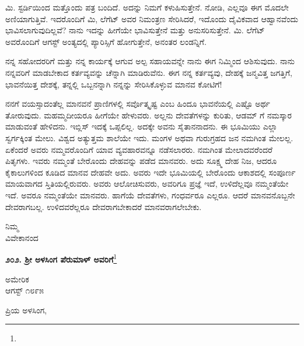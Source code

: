 \vspace{0.15cm}

ಮಿ. ಸ್ಟರ್ಡಿಯಿಂದ ಮತ್ತೊಂದು ಪತ್ರ ಬಂದಿದೆ. ಅದನ್ನು ನಿಮಗೆ ಕಳುಹಿಸುತ್ತೇನೆ. ನೋಡಿ, ಎಲ್ಲವೂ ಈಗ ಮೊದಲೇ ಅಣಿಯಾಗುತ್ತಿವೆ. ಇದರೊಂದಿಗೆ ಮಿ, ಲೆಗೆಟ್ ಅವರ ನಿಮಂತ್ರಣ ಸೇರಿಸಿದರೆ, ಇದೊಂದು ದೈವಿಕವಾದ ಆಹ್ವಾನವೆಂದು ಭಾವಿಸಲಾಗುವುದಿಲ್ಲವೆ? ನಾನು ಇದನ್ನು ಹೀಗೆಯೇ ಭಾವಿಸುತ್ತೇನೆ ಮತ್ತು ಅನುಸರಿಸುತ್ತೇನೆ. ಮಿ. ಲೆಗೆಟ್ ಅವರೊಂದಿಗೆ ಆಗಸ್ಟ್ ಅಂತ್ಯದಲ್ಲಿ ಪ್ಯಾರಿಸ್ಸಿಗೆ ಹೋಗುತ್ತೇನೆ, ಅನಂತರ ಲಂಡನ್ನಿಗೆ.

\vspace{0.15cm}

ನನ್ನ ಸಹೋದರರಿಗೆ ಮತ್ತು ನನ್ನ ಕಾರ್ಯಕ್ಕೆ ಆಗುವ ಅಲ್ಪ ಸಹಾಯವನ್ನೇ ನಾನು ಈಗ ನಿಮ್ಮಿಂದ ಆಶಿಸುವುದು. ನಾನು ನನ್ನವರಿಗೆ ಮಾಡಬೇಕಾದ ಕರ್ತವ್ಯವನ್ನು ಚೆನ್ನಾಗಿ ಮಾಡಿರುವೆನು. ಈಗ ನನ್ನ ಕರ್ತವ್ಯವು, ದೇಹಕ್ಕೆ ಜನ್ಮವಿತ್ತ ಜಗತ್ತಿಗೆ, ಭಾವನೆಯಿತ್ತ ದೇಶಕ್ಕೆ, ತನ್ನಲ್ಲಿ ಒಬ್ಬನನ್ನಾಗಿ ನನ್ನನ್ನು ಸೇರಿಸಿಕೊಳ್ಳುವ ಮಾನವ ಕೋಟಿಗೆ!

\vspace{0.15cm}

ನನಗೆ ವಯಸ್ಸಾದಂತೆಲ್ಲ ಮಾನವನೆ ಪ್ರಾಣಿಗಳಲ್ಲಿ ಸರ್ವೊತ್ಕೃಷ್ಟ ಎಂಬ ಹಿಂದೂ ಭಾವನೆಯಲ್ಲಿ ಎಷ್ಟೊ ಅರ್ಥ ತೋರುವುದು. ಮಹಮ್ಮದೀಯರೂ ಹೀಗೆಯೇ ಹೇಳುವರು. ಅಲ್ಲನು ದೇವತೆಗಳನ್ನು ಕುರಿತು, ಆಡಮ್ ಗೆ ನಮಸ್ಕಾರ ಮಾಡುವಂತೆ ಹೇಳಿದನು. ಇಬ್ಲಿಸ್ ಇದಕ್ಕೆ ಒಪ್ಪಲಿಲ್ಲ. ಅದಕ್ಕೇ ಅವನು ಸೈತಾನನಾದನು. ಈ ಭೂಮಿಯು ಎಲ್ಲಾ ಸ್ವರ್ಗಕ್ಕಿಂತ ಮೇಲು. ವಿಶ್ವದ ಅತ್ಯುತ್ತಮ ಶಾಲೆಯೇ ಇದು. ಮಂಗಳ ಅಥವಾ ಗುರುಗ್ರಹದ ಜನ ನಮಗಿಂತ ಮೇಲಲ್ಲ. ಏಕೆಂದರೆ ಅವರು ನಮ್ಮವರೊಂದಿಗೆ ಯಾವ ವ್ಯವಹಾರವನ್ನೂ ನಡೆಸಲಾರರು. ನಮಗಿಂತ ಮೇಲಾದವರೆಂದರೆ ಪಿತೃಗಳು. ಇವರು ನಮ್ಮಂತೆ ಬೇರೊಂದು ದೇಹವನ್ನು ಪಡೆದ ಮಾನವರು. ಅದು ಸೂಕ್ಷ್ಮ ದೇಹ ನಿಜ, ಆದರೂ ಕೈಕಾಲುಗಳಿಂದ ಕೂಡಿದ ಮಾನವ ದೇಹವೇ ಅದು. ಅವರು ಇದೇ ಭೂಮಿಯಲ್ಲಿ ಬೇರೊಂದು ಆಕಾಶದಲ್ಲಿ ಸಂಪೂರ್ಣ ಮಾಯವಾಗದ ಸ್ತಿತಿಯಲ್ಲಿರುವರು. ಅವರು ಆಲೋಚಿಸುವರು, ಅವರಿಗೂ ಪ್ರಜ್ಞೆ ಇದೆ, ಉಳಿದೆಲ್ಲವೂ ನಮ್ಮಂತೆಯೇ ಇದೆ. ಅವರೂ ನಮ್ಮಂತೆಯೇ ಮಾನವರು. ಹಾಗೆಯೆ ದೇವತೆಗಳು, ಗಂಧರ್ವರೂ ಎಲ್ಲರೂ. ಆದರೆ ಮಾನವನೊಬ್ಬನೇ ದೇವರಾಗಬಲ್ಲ. ಉಳಿದವರೆಲ್ಲರೂ ದೇವರಾಗಬೇಕಾದರೆ ಮಾನವರಾಗಲೇಬೇಕು.

{\flushright
ನಿಮ್ಮ\\ವಿವೇಕಾನಂದ\par}

\newpage

\begin{center}
\textbf{೨೦೨. ಶ‍್ರೀ ಅಳಸಿಂಗ ಪೆರುಮಾಳ್ ಅವರಿಗೆ}\footnote{}
\end{center}

\vspace{-0.5cm}

\begin{flushright}
ಅಮೇರಿಕ\\ಆಗಸ್ಟ್ ೧೮೯೫
\end{flushright}

\noindent
ಪ್ರಿಯ ಅಳಸಿಂಗ,

